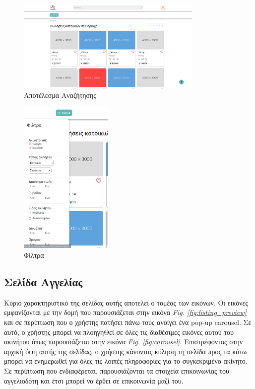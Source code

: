 \documentclass[manuscript,screen,review, language=greek, language=english]{acmart}
\begin{document}
	\begin{figure}[H]
		   \includegraphics[width=0.8\textwidth]{search_page.png}
		   \caption{Αποτέλεσμα Αναζήτησης}
		   \label{fig:search_page}
	\end{figure}
	\begin{figure}[H]
		   \includegraphics[width=0.4\textwidth]{filter.png}
		   \caption{Φίλτρα}
		   \label{fig:filters}
	\end{figure}

\subsection{Σελίδα Αγγελίας}
	Κύριο χαρακτηριστικό της σελίδας αυτής αποτελεί ο τομέας των εικόνων. Οι εικόνες
	εμφανίζονται με την δομή που παρουσιάζεται στην εικόνα
	\emph{Fig. \ref{fig:listing_preview}} και
	σε περίπτωση που ο χρήστης πατήσει πάνω τους ανοίγει ένα pop-up carousel. Σε αυτό, ο
	χρήστης μπορεί να πλοηγηΘεί σε όλες τις διαθέσιμες εικόνες αυτού του ακινήτου όπως
	παρουσιάζεται στην εικόνα \emph{Fig. \ref{fig:carousel}}.
	Επιστρέφοντας στην αρχική όψη αυτής της σελίδας, ο χρήστης κάνοντας κύληση τη σελίδα
	προς τα
	κάτω μπορεί να ενημερωθεί για όλες τις λοιπές πληροφορίες για το συγκεκριμένο
	ακίνητο. Σε περίπτωση που ενδιαφέρεται, παρουσιάζονται τα στοιχεία επικοινωνίας του
	αγγελιοδότη και έτσι μπορεί να έρθει σε επικοινωνία μαζί του.
\end{document}
